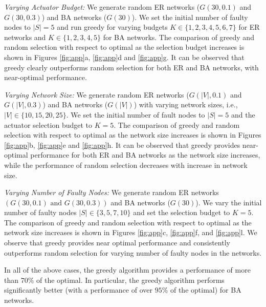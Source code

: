 \documentclass[twocolumn]{autart}    %
\begin{document}
\textit{Varying Actuator Budget: } We generate random ER networks ($G(30,0.1)$ and $G(30,0.3)$) and BA networks ($G(30)$). We set the initial number of faulty nodes to $|S| = 5$ and run greedy for varying budgets $K \in \{1,2,3,4,5,6,7\}$ for ER networks and $K \in \{1,2,3,4,5\}$ for BA networks. The comparison of greedy and random selection with respect to optimal as the selection budget increases is shown in Figures \ref{fig:app}a, \ref{fig:app}d and \ref{fig:app}g. It can be observed that greedy clearly outperforms random selection for both ER and BA networks, with near-optimal performance. 

\textit{Varying Network Size: } We generate random ER networks ($G(|V|,0.1)$ and $G(|V|,0.3)$) and BA networks ($G(|V|)$) with varying network sizes, i.e., $|V| \in  \{10,15,20,25\}$. We set the initial number of fault nodes to $|S| = 5$ and the actuator selection budget to $K=5$. The comparison of greedy and random selection with respect to optimal as the network size increases is shown in Figures \ref{fig:app}b, \ref{fig:app}e and \ref{fig:app}h. It can be observed that greedy provides near-optimal performance for both ER and BA networks as the network size increases, while the performance of random selection decreases with increase in network size. 

\textit{Varying Number of Faulty Nodes: } We generate random ER networks $(G(30,0.1) \text{ and } G(30,0.3))$ and BA networks ($G(30)$). We vary the initial number of faulty nodes $\lvert S \rvert \in \{ 3,5,7,10 \}$ and set the selection budget to $K = 5$. The comparison of greedy and random selection with respect to optimal as the network size increases is shown in Figures \ref{fig:app}c, \ref{fig:app}f, and \ref{fig:app}l. We observe that greedy provides near optimal performance and consistently outperforms random selection for varying number of faulty nodes in the networks. 

 In all of the above cases, the greedy algorithm provides a performance of more than $70\%$ of the optimal. In particular, the greedy algorithm performs significantly better (with a performance of over $95\%$ of the optimal) for BA networks. 
 
\end{document}
